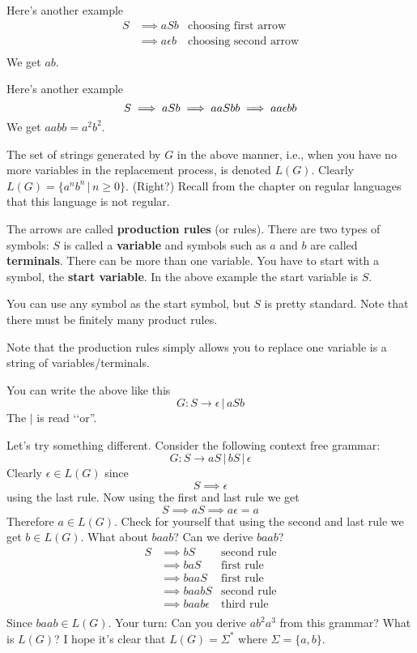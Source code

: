 Here's another example
\begin{align*}
S 
&\implies aSb & \text{choosing first arrow}\\
&\implies a\epsilon b & \text{choosing second arrow} \\
\end{align*}
We get $ab$.

Here's another example
\[
S 
\implies aSb \\
\implies aaSbb \\
\implies aa\epsilon bb
\]
We get $aabb = a^2 b^2$.

The set of strings generated by $G$ in the above manner, i.e., 
when you have no more variables in the replacement process, is denoted $L(G)$.
Clearly $L(G) = \{a^n b^n \,|\, n \geq 0\}$.
(Right?)
Recall from the chapter on regular languages that this language is not regular.

The arrows are called \textbf{production rules} (or rules).
There are two types of symbols: $S$ is called a \textbf{variable} and symbols 
such as $a$ and $b$ are called \textbf{terminals}.
There can be more than one variable.
You have to start with a symbol,  the \textbf{start variable}. 
In the above example the start variable is $S$.

You can use any symbol as the start symbol, but $S$ is pretty standard.
Note that there must be finitely many product rules.

Note that the production rules simply allows you to replace one
variable is a string of variables/terminals.

You can write the above like this
\[
G: S \rightarrow \epsilon \,|\, aSb
\]
The $|$ is read \lq\lq or''.

\begin{eg}
Let's try something different.
Consider the following context free grammar:
\[
G : S \rightarrow aS \,|\, bS \,|\, \epsilon
\]
Clearly $\epsilon \in L(G)$ since
\[
S \implies \epsilon
\]
using the last rule. Now using the first and last rule we get
\[
S 
\implies aS 
\implies a\epsilon = a
\]
Therefore $a \in L(G)$. 
Check for yourself that using the second and last rule we get $b \in L(G)$.
What about $baab$? Can we derive $baab$?
\begin{align*}
S 
&\implies bS &\text{second rule} \\
&\implies baS &\text{first rule} \\
&\implies baaS &\text{first rule} \\
&\implies baabS &\text{second rule} \\
&\implies baab\epsilon &\text{third rule} \\
\end{align*}
Since $baab \in L(G)$. 
Your turn: Can you derive $ab^2 a^3$ from this grammar?
What is $L(G)$?
I hope it's clear that $L(G) = \Sigma^*$ where $\Sigma = \{a, b\}$.
\end{eg}

